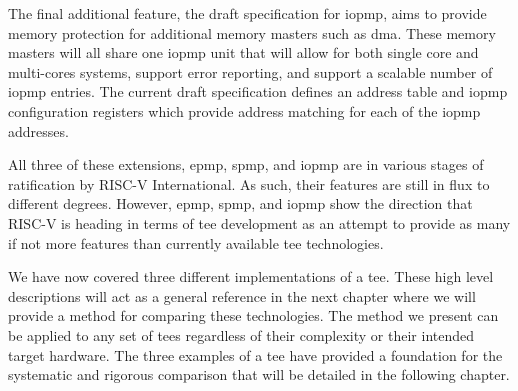 The final additional feature, the draft specification for \gls{iopmp}, aims to provide memory protection for additional memory masters such as \gls{dma}. These memory masters will all share one \gls{iopmp} unit that will allow for both single core and multi-cores systems, support error reporting, and support a scalable number of \gls{iopmp} entries. The current draft specification defines an address table and \gls{iopmp} configuration registers which provide address matching for each of the \gls{iopmp} addresses.

All three of these extensions, \gls{epmp}, \gls{spmp}, and \gls{iopmp} are in various stages of ratification by RISC-V International. As such, their features are still in flux to different degrees. However, \gls{epmp}, \gls{spmp}, and \gls{iopmp} show the direction that RISC-V is heading in terms of \gls{tee} development as an attempt to provide as many if not more features than currently available \gls{tee} technologies.

We have now covered three different implementations of a \gls{tee}. These high level descriptions will act as a general reference in the next chapter where we will provide a method for comparing these technologies. The method we present can be applied to any set of \glspl{tee} regardless of their complexity or their intended target hardware. The three examples of a \gls{tee} have provided a foundation for the systematic and rigorous comparison that will be detailed in the following chapter.

